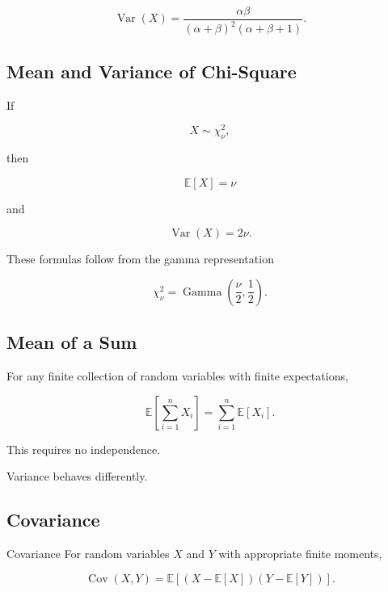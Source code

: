 \[
\boxed{
\operatorname{Var}(X)
=
\frac{
\alpha\beta
}{
(\alpha+\beta)^2
(\alpha+\beta+1)
}.
}
\]

\subsection{Mean and Variance of Chi-Square}
\label{subsec:chi-square-mean-variance}

If

\[
X\sim\chi^2_\nu,
\]

then

\[
\boxed{
\mathbb{E}[X]=\nu
}
\]

and

\[
\boxed{
\operatorname{Var}(X)=2\nu.
}
\]

These formulas follow from the gamma representation

\[
\chi^2_\nu
=
\operatorname{Gamma}
\left(
\frac{\nu}{2},
\frac12
\right).
\]

\subsection{Mean of a Sum}
\label{subsec:mean-of-sum}

For any finite collection of random variables with finite expectations,

\[
\boxed{
\mathbb{E}
\left[
\sum_{i=1}^{n}X_i
\right]
=
\sum_{i=1}^{n}
\mathbb{E}[X_i].
}
\]

This requires no independence.

Variance behaves differently.

\subsection{Covariance}
\label{subsec:covariance}

\begin{definitionbox}{Covariance}
For random variables \(X\) and \(Y\) with appropriate finite moments,

\[
\boxed{
\operatorname{Cov}(X,Y)
=
\mathbb{E}
\left[
(X-\mathbb{E}[X])
(Y-\mathbb{E}[Y])
\right].
}
\]
\end{definitionbox}

